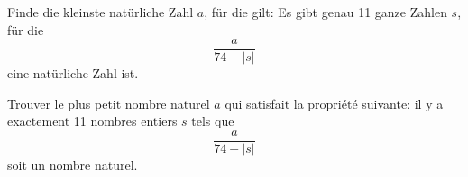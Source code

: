 Finde die kleinste natürliche Zahl $a$, für die gilt: Es gibt genau 11 ganze Zahlen $s$, für die 
\[
\frac{a}{74-|s|}
\]
eine natürliche Zahl ist.

\bigskip

Trouver le plus petit nombre naturel $a$ qui satisfait la propriété suivante: il y a exactement 11 nombres entiers $s$ tels que
\[
\frac{a}{74-|s|}
\]
soit un nombre naturel.

